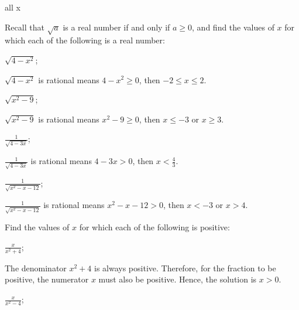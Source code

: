 \begin{questions}
\begin{solution}
\begin{tasks}
{\begin{note}
      \end{note}
      all x
      }
    \end{tasks}
  \end{solution}
  \item Recall that $\sqrt{a}$ is a real number if and only if $a \geq 0$, and find the values of $x$ for which each of the following is a real number:
  \begin{tasks}
    \task $\sqrt{4-x^2}$;

    \begin{solution}
      $\sqrt{4-x^2}$ is rational means $4-x^2 \geq 0$, then $-2 \leq x \leq 2$.
    \end{solution}

    \task $\sqrt{x^2-9}$;

    \begin{solution}
      $\sqrt{x^2-9}$ is rational means $x^2-9 \geq 0$, then $x \leq -3$ or $x \geq 3$.
    \end{solution}

    \task \(\frac{1}{\sqrt{4-3x}}\);

    \begin{solution}
      \(\frac{1}{\sqrt{4-3x}}\) is rational means $4-3x>0$, then \(x < \frac{4}{3}\).
    \end{solution}

    \task \(\frac{1}{\sqrt{x^2-x-12}}\);

    \begin{solution}
      \(\frac{1}{\sqrt{x^2-x-12}}\) is rational means $x^2-x-12>0$, then $x<-3$ or $x>4$.
    \end{solution}

  \end{tasks}

  \item Find the values of $x$ for which each of the following is positive:
  \begin{tasks}
    \task \(\frac{x}{x^2+4}\);

    \begin{solution}
      The denominator $x^2+4$ is always positive. Therefore, for the fraction to be positive, the numerator $x$ must also be positive. Hence, the solution is $x>0$.
    \end{solution}

    \task \(\frac{x}{x^2-4}\);


\end{tasks}
\end{questions}
